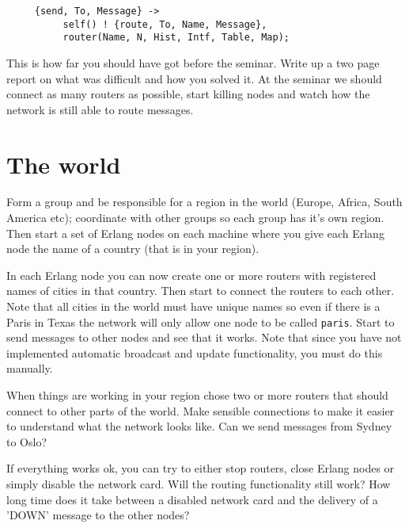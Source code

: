 \documentclass[a4paper, 11pt]{article}
\begin{document}
\begin{verbatim}
     {send, To, Message} ->
          self() ! {route, To, Name, Message},
          router(Name, N, Hist, Intf, Table, Map);
\end{verbatim}

This is how far you should have got before the seminar. Write up a two
page report on what was difficult and how you solved it. At the
seminar we should connect as many routers as possible, start killing
nodes and watch how the network is still able to route messages.

\section{The world}

Form a group and be responsible for a region in the world (Europe,
Africa, South America etc); coordinate with other groups so each group
has it's own region. Then start a set of Erlang nodes on each machine
where you give each Erlang node the name of a country (that is in your
region).

In each Erlang node you can now create one or more routers with
registered names of cities in that country. Then start to connect the
routers to each other. Note that all cities in the world must have
unique names so even if there is a Paris in Texas the network will only
allow one node to be called {\tt paris}. Start to send messages to
other nodes and see that it works. Note that since you have not
implemented automatic broadcast and update functionality, you must do
this manually.

When things are working in your region chose two or more routers that
should connect to other parts of the world. Make sensible connections
to make it easier to understand what the network looks like. Can we
send messages from Sydney to Oslo?

If everything works ok, you can try to either stop routers, close
Erlang nodes or simply disable the network card. Will the routing
functionality still work? How long time does it take between a
disabled network card and the delivery of a 'DOWN' message to the
other nodes?
\end{document}
